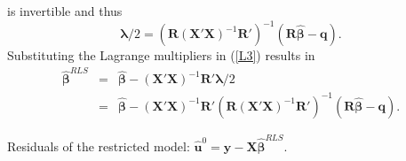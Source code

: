 \documentclass{article}
\begin{document}
is invertible and thus
\[
\mathbf{\mathbf{\lambda }}/2=\left( \mathbf{R}\left( \mathbf{X}'%
\mathbf{X}\right) ^{-1}\mathbf{\mathbf{R}'}\right) ^{-1}\left( 
\mathbf{R\hat{\beta}-q}\right) . 
\]
Substituting the Lagrange multipliers in (\ref{L3}) results in
\begin{eqnarray}
\mathbf{\mathbf{\hat{\beta}}}^{RLS} &=&\mathbf{\hat{\beta}-}\left( \mathbf{X}%
'\mathbf{X}\right) ^{-1}\mathbf{\mathbf{R}'\mathbf{\lambda}}/2  \nonumber \\
&=&\mathbf{\hat{\beta}-}\left( \mathbf{X}'\mathbf{X}\right) ^{-1}%
\mathbf{\mathbf{R}'}\left( \mathbf{R}\left( \mathbf{X}'%
\mathbf{X}\right) ^{-1}\mathbf{\mathbf{R}'}\right) ^{-1}\left( 
\mathbf{R\hat{\beta}-q}\right) .  \label{RLS}
\end{eqnarray}

Residuals of the restricted model:
$\mathbf{\hat{u}}^{0}=\mathbf{y}-\mathbf{X\hat{\beta}}^{RLS}$.
\end{document}
